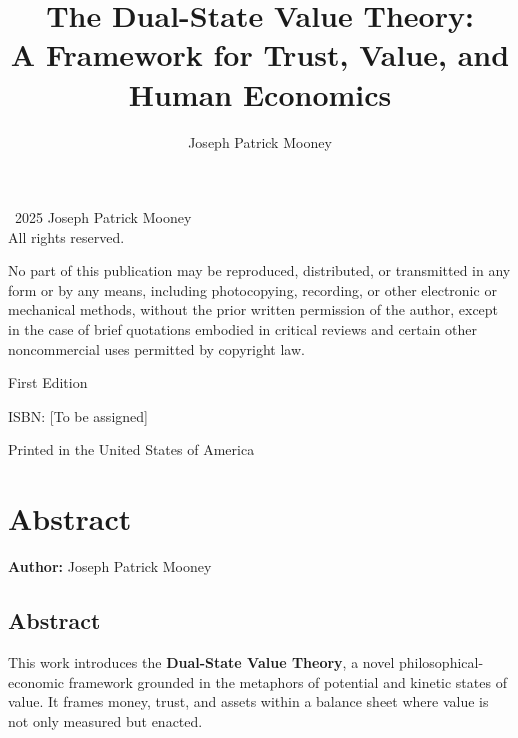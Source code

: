 \documentclass[11pt,oneside]{book}
\title{The Dual-State Value Theory:\\A Framework for Trust, Value, and Human Economics}
\author{Joseph Patrick Mooney}
\date{}
\begin{document}
\maketitle
\thispagestyle{empty}

\newpage
\thispagestyle{empty}
\vspace*{\fill}
\begin{center}
\textcopyright\ 2025 Joseph Patrick Mooney\\
All rights reserved.\\

\vspace{1em}

No part of this publication may be reproduced, distributed, or transmitted in any form or by any means, including photocopying, recording, or other electronic or mechanical methods, without the prior written permission of the author, except in the case of brief quotations embodied in critical reviews and certain other noncommercial uses permitted by copyright law.

\vspace{2em}

First Edition

\vspace{2em}

ISBN: [To be assigned]

\vspace{2em}

Printed in the United States of America
\end{center}
\vspace*{\fill}

\newpage
\tableofcontents

\chapter*{Abstract}


\textbf{Author:} Joseph Patrick Mooney

\section*{Abstract}

This work introduces the \textbf{Dual-State Value Theory}, a novel philosophical-economic framework grounded in the metaphors of potential and kinetic states of value. It frames money, trust, and assets within a balance sheet where value is not only measured but enacted. 
\end{document}
